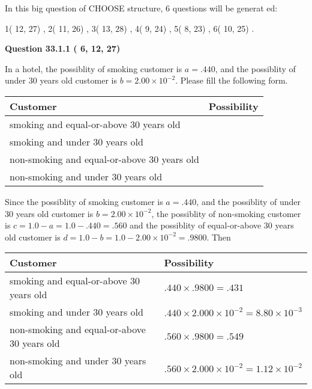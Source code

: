 \documentclass[12pt]{article}
\begin{document}
   
\vspace{0.2in}
   
 In this big question of CHOOSE structure,           6 questions will be generat
 ed: 
  
  
            1(         12,         27)
 ,
            2(         11,         26)
 ,
            3(         13,         28)
 ,
            4(          9,         24)
 ,
            5(          8,         23)
 ,
            6(         10,         25)
 .
  
\vspace{0.2in}
  
{\textbf{\Large{Question
33.1.1 
 (          6,         12,         27)
}}}
  
  
In a hotel, the possiblity of  %
smoking customer is
$a =  %
.440$, and the possiblity of  %
 under 30 years old customer is $ b =  %
2.00 \times 10^{-2}$.
Please fill the following form.
 
\noindent
\begin{tabular}{|l|l|}
\hline
Customer & Possibility \\
\hline
smoking  and   %
equal-or-above 30 years old  & \\
\hline
smoking  and   %
under 30 years old & \\
\hline
 non-smoking and   %
equal-or-above 30 years old  & \\
\hline
 non-smoking and  %
under 30 years old & \\
\hline
\end{tabular}
 
 
 
 
 
\noindent{}
 
 

Since the possiblity of  %
smoking customer is $ a =  %
.440 $,
and the possiblity of  %
 under 30 years old customer is $ b =  %
2.00 \times 10^{-2} $,
the possiblity of  %
non-smoking customer is $ c = 1.0 - a = 1.0 -
.440
=  %
.560 $ and the possiblity of  %
equal-or-above 30 years old
customer is $ d = 1.0 - b = 1.0 -  %
2.00 \times 10^{-2} =  %
.9800  $.
Then
 
\noindent
\begin{tabular}{|l|l|}
\hline
Customer & Possibility \\
\hline
smoking  and  %
equal-or-above 30 years old  &
  $ %
.440 \times  %
.9800 =  %
.431$ \\
\hline
smoking  and  %
under 30 years old &
  $ %
.440 \times  %
2.000 \times 10^{-2} =  %
8.80 \times 10^{-3}$ \\
\hline
 non-smoking and  %
equal-or-above 30 years old  &
  $ %
.560 \times  %
.9800 =  %
.549$ \\
\hline
 non-smoking and  %
under 30 years old &
  $ %
.560 \times  %
2.000 \times 10^{-2} =  %
1.12 \times 10^{-2}$ \\
\hline
\end{tabular}
 
\end{document}
